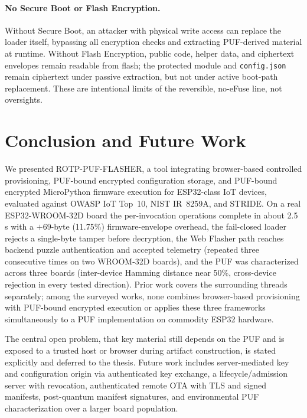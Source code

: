 \documentclass[runningheads]{llncs}
\begin{document}
\paragraph{No Secure Boot or Flash Encryption.}
Without Secure Boot, an attacker with physical write access can replace the loader itself, bypassing all encryption checks and extracting PUF-derived material at runtime. Without Flash Encryption, public code, helper data, and ciphertext envelopes remain readable from flash; the protected module and \texttt{config.json} remain ciphertext under passive extraction, but not under active boot-path replacement. These are intentional limits of the reversible, no-eFuse line, not oversights.

\section{Conclusion and Future Work}
\label{sec:conclusion}

We presented ROTP-PUF-FLASHER, a tool integrating browser-based controlled provisioning, PUF-bound encrypted configuration storage, and PUF-bound encrypted MicroPython firmware execution for ESP32-class IoT devices, evaluated against OWASP IoT Top~10, NIST IR~8259A, and STRIDE. On a real ESP32-WROOM-32D board the per-invocation operations complete in about 2.5\,s with a $+69$-byte (11.75\%) firmware-envelope overhead, the fail-closed loader rejects a single-byte tamper before decryption, the Web Flasher path reaches backend puzzle authentication and accepted telemetry (repeated three consecutive times on two WROOM-32D boards), and the PUF was characterized across three boards (inter-device Hamming distance near 50\%, cross-device rejection in every tested direction). Prior work covers the surrounding threads separately; among the surveyed works, none combines browser-based provisioning with PUF-bound encrypted execution or applies these three frameworks simultaneously to a PUF implementation on commodity ESP32 hardware.

The central open problem, that key material still depends on the PUF and is exposed to a trusted host or browser during artifact construction, is stated explicitly and deferred to the thesis. Future work includes server-mediated key and configuration origin via authenticated key exchange, a lifecycle/admission server with revocation, authenticated remote OTA with TLS and signed manifests, post-quantum manifest signatures, and environmental PUF characterization over a larger board population.
\end{document}
